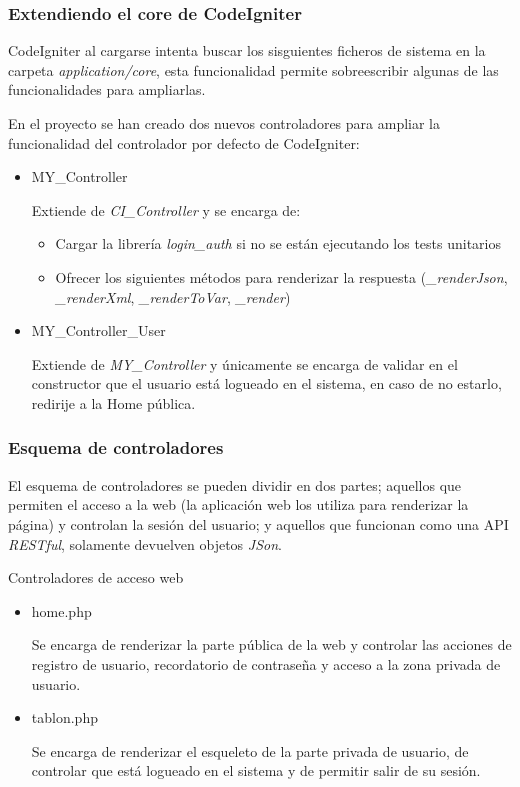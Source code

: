     \subsubsection{Extendiendo el core de CodeIgniter}

    CodeIgniter al cargarse intenta buscar los sisguientes ficheros de sistema en la carpeta \emph{application/core}, esta funcionalidad permite sobreescribir algunas de las funcionalidades para ampliarlas.

    En el proyecto se han creado dos nuevos controladores para ampliar la funcionalidad del controlador por defecto de CodeIgniter:

    \begin{itemize}
        \item MY\_Controller

        Extiende de \emph{CI\_Controller} y se encarga de:

            \begin{itemize}
                \item Cargar la librería \emph{login\_auth} si no se están ejecutando los tests unitarios
                \item Ofrecer los siguientes métodos para renderizar la respuesta (\emph{\_renderJson}, \emph{\_renderXml}, \emph{\_renderToVar}, \emph{\_render})
            \end{itemize}

        \item MY\_Controller\_User

        Extiende de \emph{MY\_Controller} y únicamente se encarga de validar en el constructor que el usuario está logueado en el sistema, en caso de no estarlo, redirije a la Home pública.
    \end{itemize}

    \subsubsection{Esquema de controladores}

El esquema de controladores se pueden dividir en dos partes; aquellos que permiten el acceso a la web (la aplicación web los utiliza para renderizar la página) y controlan la sesión del usuario; y aquellos que funcionan como una API \emph{RESTful}, solamente devuelven objetos \emph{JSon}.

Controladores de acceso web

    \begin{itemize}
        \item home.php

            Se encarga de renderizar la parte pública de la web y controlar las acciones de registro de usuario, recordatorio de contraseña y acceso a la zona privada de usuario.

        \item tablon.php

            Se encarga de renderizar el esqueleto de la parte privada de usuario, de controlar que está logueado en el sistema y de permitir salir de su sesión.
    \end{itemize}

